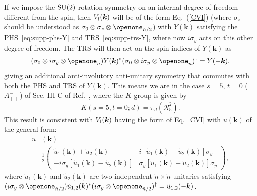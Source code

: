 \documentclass[prl,twocolumn,preprintnumbers,superscriptaddress,amsmath,amssymb]{revtex4-1}
\begin{document}
If we impose the ${\rm SU}(2)$ rotation symmetry on an internal degree of freedom different from the spin, then $V_{\rm f}(\boldsymbol{k})$ will be of the form Eq.~(\ref{CVI}) (where $\sigma_z$ should be understood as $\sigma_0\otimes\sigma_z\otimes\openone_{\tilde n/2}$) with $Y(\boldsymbol{k})$ satisfying the PHS~\eqref{eq:supp-phs-Y} and TRS~\eqref{eq:supp-trs-Y}, where now $i\sigma_y$ acts on this other degree of freedom. The TRS will then act on the spin indices of $Y(\boldsymbol{k})$ as 
\begin{equation}
    (\sigma_0\otimes i\sigma_y \otimes \openone_{\tilde n}) Y(\boldsymbol{k})^*(\sigma_0\otimes i\sigma_y \otimes \openone_{\tilde n})^\dag = Y(-\boldsymbol{k}).
\end{equation}
giving an additional anti-involutory anti-unitary symmetry that commutes with both the PHS and TRS of $Y(\boldsymbol{k})$. This means we are in the case $s=5$, $t=0$ ($A^-_{++}$) of Sec. III C of Ref.~\cite{Shiozaki2014}, where the $K$-group is given by
\begin{equation}
    K(s=5,t=0;d)=\pi_d(\mathcal{R}_5^2). 
\end{equation}
This result is consistent with $V_{\rm f}(\boldsymbol{k})$ having the form of Eq.~\eqref{CVI} with $u(\boldsymbol{k})$ of the general form:
\begin{equation}
    \begin{split}
        u&(\boldsymbol{k})=\\
        &\frac{1}{2}\begin{pmatrix} \tilde u_1(\boldsymbol{k})+\tilde u_2(\boldsymbol{k}) & i[\tilde u_1(\boldsymbol{k})-\tilde u_2(\boldsymbol{k})]\sigma_y \\
        -i\sigma_y [\tilde u_1(\boldsymbol{k})-\tilde u_2(\boldsymbol{k})] & \sigma_y [\tilde u_1(\boldsymbol{k})+\tilde u_2(\boldsymbol{k})] \sigma_y \end{pmatrix},
    \end{split}
\label{CIIV}
\end{equation}
where $\tilde u_1(\boldsymbol{k})$ and $\tilde u_2(\boldsymbol{k})$ are two independent $\tilde n\times\tilde n$ unitaries satisfying $(i\sigma_y\otimes \openone_{\tilde n /2}) \tilde u_{1,2}(\boldsymbol{k})^*(i\sigma_y\otimes \openone_{\tilde n /2})^\dag =\tilde u_{1,2}(-\boldsymbol{k})$.
\end{document}
